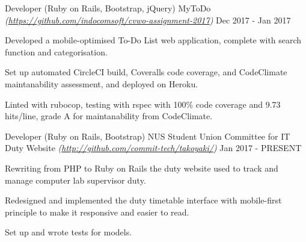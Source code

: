 

\begin{cventries}

	\cventry
		{Developer (Ruby on Rails, Bootstrap, jQuery)} %
		{MyToDo \textmd{\em\tiny(\url{https://github.com/indocomsoft/cvwo-assignment-2017})}} %
		{} %
		{Dec 2017 - Jan 2017} %
		{
			\begin{cvitems} %
				\item {Developed a mobile-optimised To-Do List web application, complete with search function and categorisation.}
				\item {Set up automated CircleCI build, Coveralls code coverage, and CodeClimate maintanability assessment, and deployed on Heroku.}
				\item {Linted with rubocop, testing with rspec with 100\% code coverage and 9.73 hits/line, grade A for maintanability from CodeClimate.}
			\end{cvitems}
		}
		
	\cventry
	{Developer (Ruby on Rails, Bootstrap)} %
	{NUS Student Union Committee for IT Duty Website \textmd{\em\tiny(\url{http://github.com/commit-tech/takoyaki/})}} %
	{} %
	{Jan 2017 - PRESENT} %
	{
		\begin{cvitems} %
			\item {Rewriting from PHP to Ruby on Rails the duty website used to track and manage computer lab supervisor duty.}
			\item {Redesigned and implemented the duty timetable interface with mobile-first principle to make it responsive and easier to read.}
			\item {Set up and wrote tests for models.}
		\end{cvitems}
	}
    

\end{cventries}
